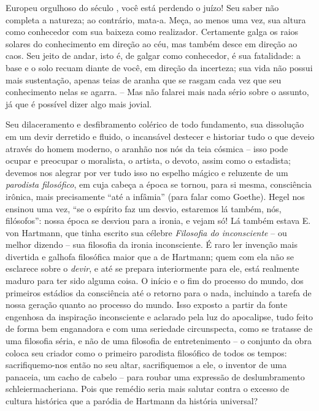     Europeu orgulhoso do século , você está perdendo o juízo!
    Seu saber não completa a natureza; ao contrário, mata-a. Meça, ao
    menos uma vez, sua altura como conhecedor com sua baixeza como
    realizador. Certamente galga os raios solares do conhecimento em
    direção ao céu, mas também desce em direção ao caos. Seu jeito de
    andar, isto é, de galgar como conhecedor, é sua fatalidade: a base e
    o solo recuam diante de você, em direção da incerteza; sua vida não
    possui mais sustentação, apenas teias de aranha que se rasgam cada
    vez que seu conhecimento nelas se agarra. -- Mas não falarei mais
    nada sério sobre o assunto, já que é possível dizer algo mais
    jovial.

    Seu dilaceramento e desfibramento colérico de todo fundamento, sua
    dissolução em um devir derretido e fluido, o incansável destecer e
    historiar tudo o que deveio através do homem moderno, o aranhão nos
    nós da teia cósmica -- isso pode ocupar e preocupar o moralista, o
    artista, o devoto, assim como o estadista; devemos nos alegrar por
    ver tudo isso no espelho mágico e reluzente de um \emph{parodista
    filosófico}, em cuja cabeça a época se tornou, para si mesma,
    consciência irônica, mais precisamente ``até a infâmia'' (para falar
    como Goethe). Hegel nos ensinou uma vez, ``se o espírito faz um
    desvio, estaremos lá também, nós, filósofos'': nossa época se
    desviou para a ironia, e vejam só! Lá também estava E. von Hartmann,
    que tinha escrito sua célebre \emph{Filosofia do inconsciente} -- ou
    melhor dizendo -- sua filosofia da ironia inconsciente. É raro ler
    invenção mais divertida e galhofa filosófica maior que a de
    Hartmann; quem com ela não se esclarece sobre o \emph{devir}, e até
    se prepara interiormente para ele, está realmente maduro para ter
    sido alguma coisa. O início e o fim do processo do mundo, dos
    primeiros estádios da consciência até o retorno para o nada,
    incluindo a tarefa de nossa geração quanto ao processo do mundo.
    Isso exposto a partir da fonte engenhosa da inspiração inconsciente
    e aclarado pela luz do apocalipse, tudo feito de forma bem
    enganadora e com uma seriedade circunspecta, como se tratasse de uma
    filosofia séria, e não de uma filosofia de entretenimento -- o
    conjunto da obra coloca seu criador como o primeiro parodista
    filosófico de todos os tempos: sacrifiquemo-nos então no seu altar,
    sacrifiquemos a ele, o inventor de uma panaceia, um cacho de cabelo
    -- para roubar uma expressão de deslumbramento schleiermacheriana.
    Pois que remédio seria mais salutar contra o excesso de cultura
    histórica que a paródia de Hartmann da história universal?

